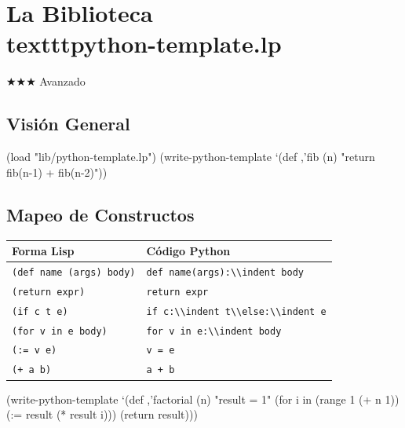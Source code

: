 \chapter{La Biblioteca \\texttt{python-template.lp}}
\label{chap:python-template}
{\huge$\bigstar$}{\huge$\bigstar$}{\huge$\bigstar$} Avanzado

\section{Visión General}
\begin{lispcode}
(load "lib/python-template.lp")
(write-python-template `(def ,'fib (n) "return fib(n-1) + fib(n-2)"))
\end{lispcode}

\section{Mapeo de Constructos}
\begin{tabular}{ll}
\toprule
Forma Lisp & Código Python \\
\midrule
\texttt{(def name (args) body)} & \texttt{def name(args):\textbackslash\textbackslash indent body} \\
\texttt{(return expr)} & \texttt{return expr} \\
\texttt{(if c t e)} & \texttt{if c:\textbackslash\textbackslash indent t\textbackslash\textbackslash else:\textbackslash\textbackslash indent e} \\
\texttt{(for v in e body)} & \texttt{for v in e:\textbackslash\textbackslash indent body} \\
\texttt{(:= v e)} & \texttt{v = e} \\
\texttt{(+ a b)} & \texttt{a + b} \\
\bottomrule
\end{tabular}

\begin{examplebox}[title=Generar función factorial]
\begin{lispcode}
(write-python-template
  `(def ,'factorial (n)
     "result = 1"
     (for i in (range 1 (+ n 1))
       (:= result (* result i)))
     (return result)))
\end{lispcode}
\end{examplebox}

